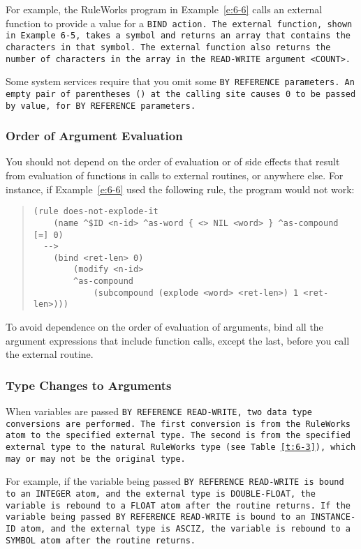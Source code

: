 \begin{itemize}
  For example, the RuleWorks program in Example~\ref{e:6-6} calls an external
  function to provide a value for a \tt{BIND} action. The external
  function, shown in Example 6-5, takes a symbol and returns an array
  that contains the characters in that symbol. The external function
  also returns the number of characters in the array in the
  \tt{READ-WRITE} argument \verb|<COUNT>|.

  Some system services require that you omit some \tt{BY REFERENCE}
  parameters. An empty pair of parentheses \verb|()| at the calling
  site causes 0 to be passed by value, for \tt{BY REFERENCE}
  parameters.
\end{itemize}

\subsubsection{Order of Argument Evaluation}

You should not depend on the order of evaluation or of side effects
that result from evaluation of functions in calls to external
routines, or anywhere else. For instance, if Example~\ref{e:6-6} used
the following rule, the program would not work:

\begin{quote}
\begin{verbatim}
(rule does-not-explode-it
    (name ^$ID <n-id> ^as-word { <> NIL <word> } ^as-compound [=] 0)
  -->
    (bind <ret-len> 0)
        (modify <n-id>
        ^as-compound
            (subcompound (explode <word> <ret-len>) 1 <ret-len>)))
\end{verbatim}
\end{quote}

To avoid dependence on the order of evaluation of arguments, bind all
the argument expressions that include function calls, except the last,
before you call the external routine.

\subsubsection{Type Changes to Arguments}

When variables are passed \tt{BY REFERENCE READ-WRITE}, two data type
conversions are performed. The first conversion is from the RuleWorks
atom to the specified external type. The second is from the specified
external type to the natural RuleWorks type (see Table~\ref{t:6-3}),
which may or may not be the original type.

For example, if the variable being passed \tt{BY REFERENCE READ-WRITE}
is bound to an \tt{INTEGER} atom, and the external type is
\tt{DOUBLE-FLOAT}, the variable is rebound to a \tt{FLOAT} atom after
the routine returns. If the variable being passed \tt{BY REFERENCE
  READ-WRITE} is bound to an \tt{INSTANCE-ID} atom, and the external
type is \tt{ASCIZ}, the variable is rebound to a \tt{SYMBOL} atom
after the routine returns.

